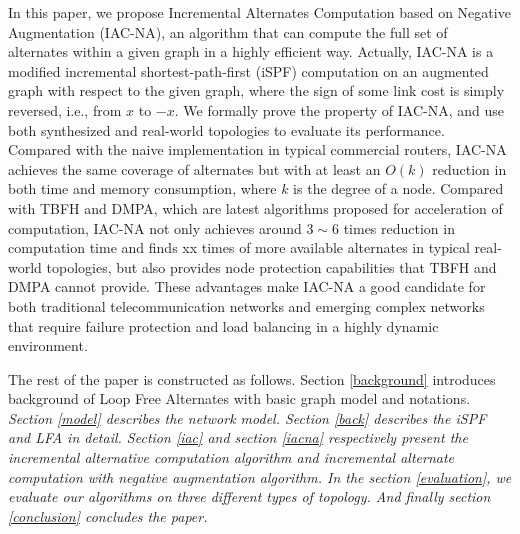 In this paper, we propose Incremental Alternates Computation based on Negative 
Augmentation (IAC-NA), an algorithm that can 
compute the full set of alternates within a given graph in a highly efficient way. 
Actually, IAC-NA is a modified incremental shortest-path-first (iSPF) computation
on an augmented graph with respect to the given graph, where the sign of some link cost 
is simply reversed, i.e., from $x$ to $-x$. We formally prove the property of IAC-NA, 
and use both synthesized and real-world topologies to evaluate its performance.
Compared with the naive implementation in typical commercial routers, IAC-NA achieves the same coverage of alternates but  
with at least an $O(k)$ reduction in both time and memory consumption, where $k$ is the degree of a node. 
Compared with TBFH and DMPA, which are latest algorithms proposed for acceleration of computation, 
IAC-NA not only achieves around $3 \sim 6$ times reduction in computation time 
and finds xx times of more available alternates in typical real-world topologies, but also 
provides  node protection capabilities that TBFH and DMPA cannot provide.
These advantages make IAC-NA a good candidate for both traditional telecommunication networks 
and emerging complex networks that require failure protection and load balancing 
in a highly dynamic environment.
\iffalse
Our contributions are summarized as follows:
\begin{itemize}
\item We propose an incremental alternates computation (IAC) algorithm based on iSPF, which can compute all the next hops satisfied DC rule. %
\item Theoretical analysis indicates that the computation complexity of IAC is less than that of constructing a shortest path tree and  can provide the same network availability as DC.
\item We propose an IAC-NA algorithm which can  efficiently calculate
the minimum cost of all its neighbors to all other nodes of the
network on the shortest path tree rooted at the compute node. Therefore
IAC-NA can completely and efficiently deal with LFA problem.
\item Theoretical analysis and experiments results indicate that IAC-NA can provide the same network availability as LFA.
\end{itemize}
\fi

The rest of the paper is constructed as follows. 
Section \ref{background} introduces background of Loop Free Alternates with basic graph model and notations.
{\em Section \ref{model}  describes the network model.
Section \ref{back} describes the iSPF and LFA in detail.
Section \ref{iac} and section \ref{iacna} respectively present the incremental alternative computation algorithm and incremental alternate computation with negative augmentation algorithm.
In the section \ref{evaluation}, we evaluate our algorithms on three different types of topology.  And finally section \ref{conclusion} concludes the paper.
}



